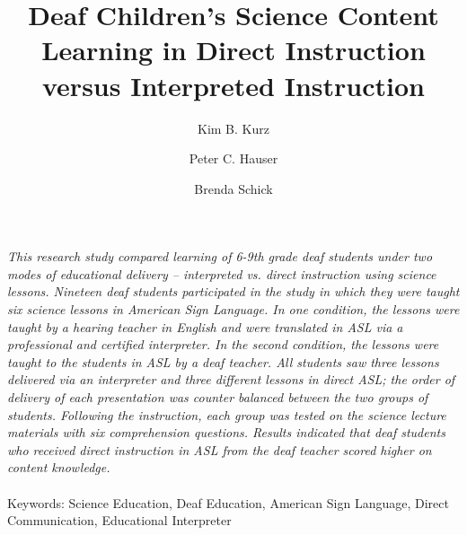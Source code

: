 \documentclass[11.5pt]{sig-alternate} %
\makeatletter
\let\oldabstract\abstract
\let\oldendabstract\endabstract
\renewenvironment{abstract} %
{\renewenvironment{quotation}%
               {\list{}{\addtolength{\leftmargin}{1em} %
                        \listparindent 1.5em%
                        \itemindent    \listparindent%
                        \rightmargin   \leftmargin%
                        \parsep        \z@ \@plus\p@}%
                \item\relax}%
               {\endlist}%
\oldabstract}
{\oldendabstract}
\makeatother
\begin{document}
\title{Deaf Children’s Science Content Learning in Direct Instruction versus Interpreted Instruction}

\author[1]{\large \color{blue}Kim B. Kurz}
\author[1]{\large \color{blue}Peter C. Hauser}
\author[2]{\large \color{blue}Brenda Schick}


\toappear{}
\maketitle
\begin{@twocolumnfalse} 
\begin{abstract}
\item 
\textit{This research study compared learning of 6-9th grade deaf students under two modes of educational delivery – interpreted vs. direct instruction using science lessons. Nineteen deaf students participated in the study in which they were taught six science lessons in American Sign Language. In one condition, the lessons were taught by a hearing teacher in English and were translated in ASL via a professional and certified interpreter. In the second condition, the lessons were taught to the students in ASL by a deaf teacher. All students saw three lessons delivered via an interpreter and three different lessons in direct ASL; the order of delivery of each presentation was counter balanced between the two groups of students. Following the instruction, each group was tested on the science lecture materials with six comprehension questions. Results indicated that deaf students who received direct instruction in ASL from the deaf teacher scored higher on content knowledge.}
\\ \\
Keywords: Science Education, Deaf Education, American Sign Language, Direct Communication, Educational Interpreter
\end{abstract}
\end{@twocolumnfalse}

\end{document}

